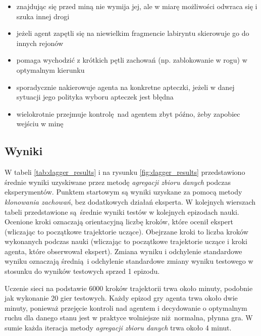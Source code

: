 \documentclass[polish,master,a4paper,oneside]{ppfcmthesis}
\begin{document}
\begin{itemize}
\item{znajdując się przed miną nie wymija jej, ale w miarę możliwości odwraca się i szuka innej drogi}
\item{jeżeli agent zapętli się na niewielkim fragmencie labiryntu skierowuje go do innych rejonów}
\item{pomaga wychodzić z krótkich pętli zachowań (np. zablokowanie w rogu) w optymalnym kierunku}
\item{sporadycznie nakierowuje agenta na konkretne apteczki, jeżeli w danej sytuacji jego polityka wyboru apteczek jest błędna}
\item{wielokrotnie przejmuje kontrolę nad agentem zbyt późno, żeby zapobiec wejściu w minę}
\end{itemize}


\subsection{Wyniki}\label{dagger_results}
W tabeli \ref{tab:dagger_results} i na rysunku \ref{fig:dagger_results} przedstawiono średnie wyniki uzyskiwane przez metodę \textit{agregacji zbioru danych} podczas eksperymentów. Punktem startowym są wyniki uzyskane za pomocą metody \textit{klonowania zachowań}, bez dodatkowych działań eksperta. W kolejnych wierszach tabeli przedstawione są średnie wyniki testów w kolejnych epizodach nauki. Ocenione kroki oznaczają orientacyjną liczbę kroków, które ocenił ekspert (wliczając to początkowe trajektorie uczące). Obejrzane kroki to liczba kroków wykonanych podczas nauki (wliczając to początkowe trajektorie uczące i kroki agenta, które obserwował ekspert). Zmiana wyniku i odchylenie standardowe wyniku oznaczają średnią i odchylenie standardowe zmiany wyniku testowego w stosunku do wyników testowych sprzed 1 epizodu. 

Uczenie sieci na podstawie 6000 kroków trajektorii trwa około minuty, podobnie jak wykonanie 20 gier testowych. Każdy epizod gry agenta trwa około dwie minuty, ponieważ przejęcie kontroli nad agentem i decydowanie o optymalnym ruchu dla danego stanu jest w praktyce wolniejsze niż normalna, płynna gra. W sumie każda iteracja metody \textit{agregacji zbioru danych} trwa około 4 minut.
\end{document}
